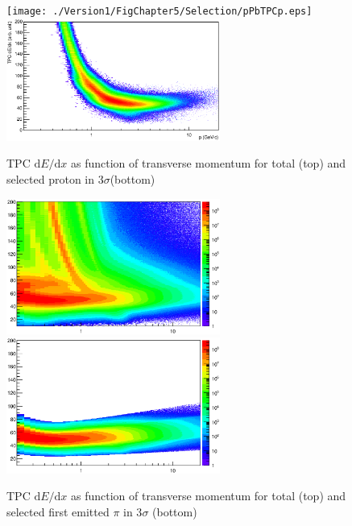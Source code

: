 \begin{figure}[htbp]
\begin{center}
\texttt{[image: ./Version1/FigChapter5/Selection/pPbTPCp.eps]}
\hspace{0.5cm}
\includegraphics[width=7.0cm]{./Version1/FigChapter5/Selection/pPbTPCpAfter.eps}
\label{fig:pPb:TPCp} 
\caption{ TPC $\mathrm{d}E/\mathrm{d}x$ as function of transverse momentum for total (top) and selected proton in 3$\sigma$(bottom) }
\end{center}
\end{figure}

\begin{figure}[htbp]
\begin{center}
\includegraphics[width=7.0cm]{./Version1/FigChapter5/Selection/PbPbTPC3rdPion.eps}
\hspace{0.5cm}
\includegraphics[width=7.0cm]{./Version1/FigChapter5/Selection/PbPbTPC3rdPionAfter.eps}
\label{fig:PbPb:TPCpionFirstEmitted} 
\caption{ TPC $\mathrm{d}E/\mathrm{d}x$ as function of transverse momentum for total (top) and selected first emitted $\pi$ in 3$\sigma$ (bottom) }
\end{center}
\end{figure}

